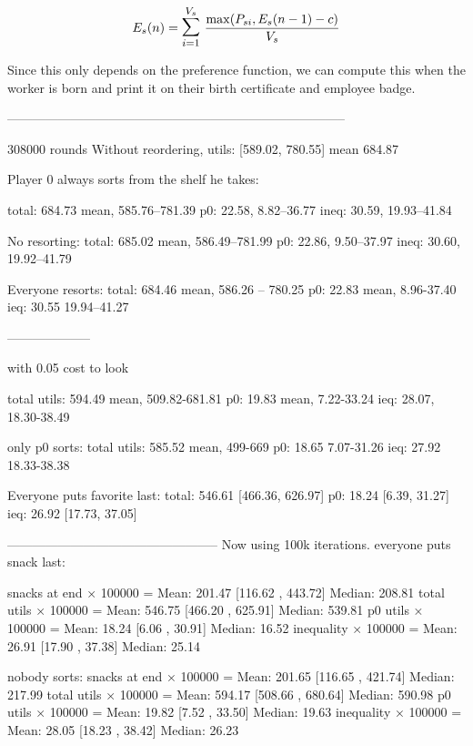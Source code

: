 \documentclass[twocolumn]{article}
\begin{document}
$$
E_s(n) = \mathlarger{\mathlarger{\sum}}_{i=1}^{V_s}\ \frac{\mathrm{max}(P_{si}, E_s(n - 1) - c)}{V_s}
$$

Since this only depends on the preference function, we can compute this when the worker is born and print it on their birth certificate and employee badge.

--------------------------------------------------------------------------------



308000 rounds
Without reordering, utils: [589.02, 780.55] mean 684.87

Player 0 always sorts from the shelf he takes:


total: 684.73 mean, 585.76--781.39
p0: 22.58, 8.82--36.77
ineq: 30.59, 19.93--41.84

No resorting:
total: 685.02 mean, 586.49--781.99
p0: 22.86, 9.50--37.97
ineq: 30.60, 19.92--41.79

Everyone resorts:
total: 684.46 mean, 586.26 -- 780.25
p0: 22.83 mean, 8.96-37.40
ieq: 30.55 19.94--41.27


--------------------

with 0.05 cost to look

total utils: 594.49 mean, 509.82-681.81
p0: 19.83 mean, 7.22-33.24
ieq: 28.07, 18.30-38.49

only p0 sorts:
total utils: 585.52 mean, 499-669
p0: 18.65 7.07-31.26
ieq: 27.92 18.33-38.38



Everyone puts favorite last:
total: 546.61 [466.36, 626.97]
p0: 18.24 [6.39, 31.27]
ieq: 26.92 [17.73, 37.05]


--------------------------------------------------
Now using 100k iterations. everyone puts snack last:

snacks at end × 100000 = Mean: 201.47 [116.62 , 443.72] Median: 208.81
total utils × 100000 = Mean: 546.75 [466.20 , 625.91] Median: 539.81
p0 utils × 100000 = Mean: 18.24 [6.06 , 30.91] Median: 16.52
inequality × 100000 = Mean: 26.91 [17.90 , 37.38] Median: 25.14

nobody sorts:
snacks at end × 100000 = Mean: 201.65 [116.65 , 421.74] Median: 217.99
total utils × 100000 = Mean: 594.17 [508.66 , 680.64] Median: 590.98
p0 utils × 100000 = Mean: 19.82 [7.52 , 33.50] Median: 19.63
inequality × 100000 = Mean: 28.05 [18.23 , 38.42] Median: 26.23
\end{document}
